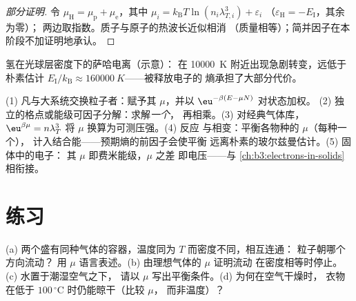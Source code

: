 \begin{proof}[部分证明]
令 $\mu_{\text{H}} = \mu_{\text{p}} + \mu_{\text{e}}$，其中 $\mu_i
= k_{\text{B}}T\ln(n_i\lambda_{T,i}^3) + \varepsilon_i$
（$\varepsilon_{\text{H}} = -E_{\text{I}}$，其余为零）；
两边取指数。质子与原子的热波长近似相消
（质量相等）；简并因子在本阶段不加证明地承认。
\end{proof}

\begin{omfigure}

{\small 氢在光球层密度下的萨哈电离（示意）：
在 \qty{10000}{K} 附近出现急剧转变，远低于朴素估计
$E_{\text{I}}/k_{\text{B}} \approx \qty{160000}{K}$——被释放电子的
熵承担了大部分代价。}
\end{omfigure}

\begin{method}[巨正则技巧]\label{met:b3:grand-canonical:method}
(1) 凡与大系统交换粒子者：赋予其
$\mu$，并以 $\eu^{-\beta(E - \mu N)}$ 对状态加权。
(2) 独立的格点或能级可因子分解：求解\emph{一个}，
再相乘。(3) 对经典气体库，$\eu^{\beta\mu} =
n\lambda_T^3$ 将 $\mu$ 换算为可测压强。(4) 反应
与相变：平衡各物种的 $\mu$（每种一个），
计入结合能——预期熵的前因子会使平衡
远离朴素的玻尔兹曼估计。(5) 固体中的电子：
其 $\mu$ 即费米能级，$\mu$ 之差
即电压——与
\cref{ch:b3:electrons-in-solids}相衔接。
\end{method}

\section{练习}

\begin{exercise}[$\star$]\label{exo:b3:grand-canonical:1}
(a) 两个盛有同种气体的容器，温度同为 $T$ 而密度不同，相互连通：
粒子朝哪个方向流动？
用 $\mu$ 语言表述。(b) 由理想气体的 $\mu$ 证明流动
在密度相等时停止。(c) 水置于潮湿空气之下，
请以 $\mu$ 写出平衡条件。(d) 为何在空气干燥时，
衣物在低于 $100\,^\circ$C 时仍能晾干（比较 $\mu$，
而非温度）？
\end{exercise}

